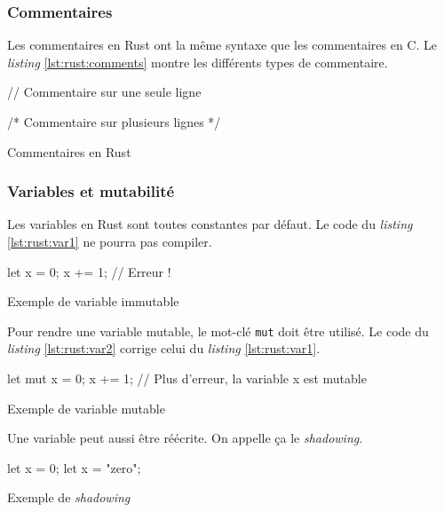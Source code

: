 \subsubsection{Commentaires}
Les commentaires en Rust ont la même syntaxe que les commentaires en C. Le \textit{listing}
\ref{lst:rust:comments} montre les différents types de commentaire.

\begin{code}
\begin{rustcode}
// Commentaire sur une seule ligne

/* Commentaire sur
   plusieurs lignes */
\end{rustcode}
\caption{Commentaires en Rust}
\label{lst:rust:comments}
\end{code} \bigbreak


\subsubsection{Variables et mutabilité}
Les variables en Rust sont toutes constantes par défaut. Le code du \textit{listing}
\ref{lst:rust:var1} ne pourra pas compiler.

\begin{code}
\begin{rustcode}
let x = 0;
x += 1; // Erreur !
\end{rustcode}
\caption{Exemple de variable immutable}
\label{lst:rust:var1}
\end{code} \bigbreak

Pour rendre une variable mutable, le mot-clé \texttt{mut} doit être utilisé.
Le code du \textit{listing} \ref{lst:rust:var2} corrige celui du \textit{listing}
\ref{lst:rust:var1}.

\begin{code}
\begin{rustcode}
let mut x = 0;
x += 1; // Plus d'erreur, la variable x est mutable
\end{rustcode}
\caption{Exemple de variable mutable}
\label{lst:rust:var2}
\end{code} \bigbreak

Une variable peut aussi être réécrite. On appelle ça le \textit{shadowing}.

\begin{code}
\begin{rustcode}
let x = 0;
let x = "zero";
\end{rustcode}
\caption{Exemple de \textit{shadowing}}
\label{lst:rust:var3}
\end{code} \bigbreak

